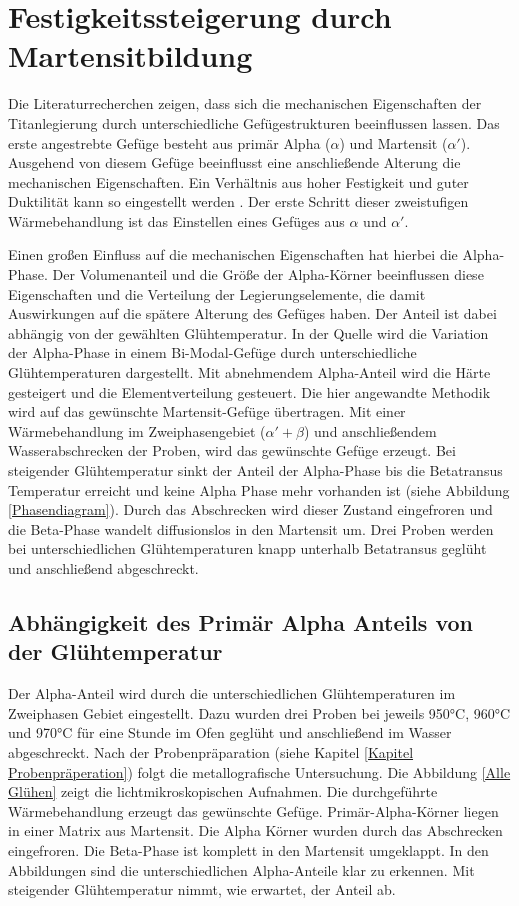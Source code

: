 \documentclass[a4paper, 11pt]{tubsreprt}
\begin{document}
\section{Festigkeitssteigerung durch Martensitbildung}\label{Festigkeitssteigerung durch Martensitbildung}
Die Literaturrecherchen zeigen, dass sich die mechanischen Eigenschaften der Titanlegierung durch unterschiedliche Gefügestrukturen beeinflussen lassen. Das erste angestrebte Gefüge besteht aus primär Alpha ($\alpha$) und Martensit ($\alpha'$). Ausgehend von diesem Gefüge beeinflusst eine anschließende Alterung die mechanischen Eigenschaften. Ein  Verhältnis aus hoher Festigkeit und guter Duktilität kann so eingestellt werden \cite[vgl.]{Gilbert1990}. Der erste Schritt dieser zweistufigen Wärmebehandlung ist das Einstellen eines Gefüges aus $\alpha$ und $\alpha'$.
 
Einen großen Einfluss auf die mechanischen Eigenschaften hat hierbei die Alpha-Phase. Der Volumenanteil und die Größe der Alpha-Körner beeinflussen diese Eigenschaften und die Verteilung der Legierungselemente, die damit Auswirkungen auf die spätere Alterung des Gefüges haben. Der Anteil ist dabei abhängig von der gewählten Glühtemperatur. In der Quelle \cite{Sahoo2015} wird die Variation der Alpha-Phase in einem Bi-Modal-Gefüge durch unterschiedliche Glühtemperaturen dargestellt. Mit abnehmendem Alpha-Anteil wird die Härte gesteigert und die Elementverteilung gesteuert. Die hier angewandte Methodik wird auf das gewünschte Martensit-Gefüge übertragen.
Mit einer Wärmebehandlung im Zweiphasengebiet ($\alpha'+ \beta$) und anschließendem Wasserabschrecken der Proben, wird das gewünschte Gefüge erzeugt. Bei steigender Glühtemperatur sinkt der Anteil der Alpha-Phase bis die Betatransus Temperatur erreicht und keine Alpha Phase mehr vorhanden ist (siehe Abbildung \ref{Phasendiagram}).  Durch das Abschrecken wird dieser Zustand eingefroren und die Beta-Phase wandelt diffusionslos in den Martensit um. Drei Proben werden bei unterschiedlichen Glühtemperaturen knapp unterhalb Betatransus geglüht und anschließend abgeschreckt.


\subsection{Abhängigkeit des Primär Alpha Anteils von der Glühtemperatur}
Der Alpha-Anteil wird durch die unterschiedlichen Glühtemperaturen im Zweiphasen Gebiet eingestellt. Dazu wurden drei Proben bei jeweils 950°C, 960°C und 970°C für eine Stunde im Ofen geglüht und anschließend im Wasser abgeschreckt. Nach der Probenpräparation (siehe Kapitel \ref{Kapitel Probenpräperation}) folgt die metallografische Untersuchung. Die Abbildung \ref{Alle Glühen} zeigt die lichtmikroskopischen Aufnahmen. Die durchgeführte Wärmebehandlung erzeugt das gewünschte Gefüge. Primär-Alpha-Körner liegen in einer Matrix aus Martensit. Die Alpha Körner wurden durch das Abschrecken eingefroren. Die Beta-Phase ist komplett in den Martensit umgeklappt. In den Abbildungen sind die  unterschiedlichen Alpha-Anteile klar zu erkennen. Mit steigender Glühtemperatur nimmt, wie erwartet, der Anteil ab. 
\end{document}
